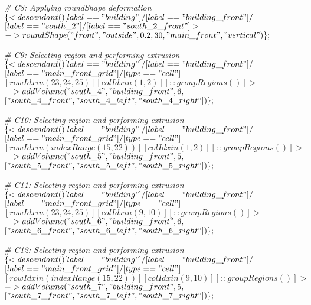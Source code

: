 \noindent \textit{\# C8: Applying roundShape deformation}\\
$\{< descendant() [label=="building"] / [label=="building\_front"] / $\\
$[label=="south\_2"] / [label=="south\_2\_front"] > $\\
$-> roundShape("front", "outside", 0.2, 30, "main\_front", "vertical")\};$

\noindent \textit{\# C9: Selecting region and performing extrusion}\\
$\{< descendant() [label=="building"] / [label=="building\_front"] / $\\
$[label=="main\_front\_grid"] / [type=="cell"] $\\
$[rowIdx in (23, 24, 25)] [colIdx in (1, 2)] [::groupRegions()] > $\\
$-> addVolume("south\_4", "building\_front", 6, $\\
$["south\_4\_front", "south\_4\_left", "south\_4\_right"])\};$

\noindent \textit{\# C10: Selecting region and performing extrusion}\\
$\{< descendant() [label=="building"] / [label=="building\_front"] / $\\
$[label=="main\_front\_grid"] / [type=="cell"] $\\
$[rowIdx in (indexRange(15, 22))] [colIdx in (1, 2)] [::groupRegions()] > $\\
$-> addVolume("south\_5", "building\_front", 5, $\\
$["south\_5\_front", "south\_5\_left", "south\_5\_right"])\};$

\noindent \textit{\# C11: Selecting region and performing extrusion}\\
$\{< descendant() [label=="building"] / [label=="building\_front"] / $\\
$[label=="main\_front\_grid"] / [type=="cell"] $\\
$[rowIdx in (23, 24, 25)] [colIdx in (9, 10)] [::groupRegions()] > $\\
$-> addVolume("south\_6", "building\_front", 6, $\\
$["south\_6\_front", "south\_6\_left", "south\_6\_right"])\};$

\noindent \textit{\# C12: Selecting region and performing extrusion}\\
$\{< descendant() [label=="building"] / [label=="building\_front"] / $\\
$[label=="main\_front\_grid"] / [type=="cell"] $\\
$[rowIdx in (indexRange(15, 22))] [colIdx in (9, 10)] [::groupRegions()] > $\\
$-> addVolume("south\_7", "building\_front", 5, $\\
$["south\_7\_front", "south\_7\_left", "south\_7\_right"])\};$

